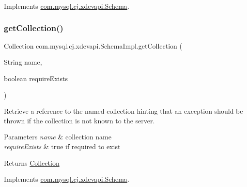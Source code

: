 Implements \mbox{\hyperlink{interfacecom_1_1mysql_1_1cj_1_1xdevapi_1_1_schema_aeb2f782db94fd4a068b1c1e6b9f3f20e}{com.\+mysql.\+cj.\+xdevapi.\+Schema}}.

\mbox{\label{classcom_1_1mysql_1_1cj_1_1xdevapi_1_1_schema_impl_a465ae06f3ba56080cbc7405ff428f01b}} 
\subsubsection{\texorpdfstring{get\+Collection()}{getCollection()}\hspace{0.1cm}{\footnotesize\ttfamily [2/2]}}
{\footnotesize\ttfamily Collection com.\+mysql.\+cj.\+xdevapi.\+Schema\+Impl.\+get\+Collection (\begin{DoxyParamCaption}\item[{String}]{name,  }\item[{boolean}]{require\+Exists }\end{DoxyParamCaption})}

Retrieve a reference to the named collection hinting that an exception should be thrown if the collection is not known to the server.


\begin{DoxyParams}{Parameters}
{\em name} & collection name \\
\hline
{\em require\+Exists} & true if required to exist \\
\hline
\end{DoxyParams}
\begin{DoxyReturn}{Returns}
\mbox{\hyperlink{interfacecom_1_1mysql_1_1cj_1_1xdevapi_1_1_collection}{Collection}} 
\end{DoxyReturn}


Implements \mbox{\hyperlink{interfacecom_1_1mysql_1_1cj_1_1xdevapi_1_1_schema_a6c7616f0106d2b05c75ed9e58238f0cf}{com.\+mysql.\+cj.\+xdevapi.\+Schema}}.

\mbox{\label{classcom_1_1mysql_1_1cj_1_1xdevapi_1_1_schema_impl_a8382999acc577f81226c60bfa015a8a9}} 
